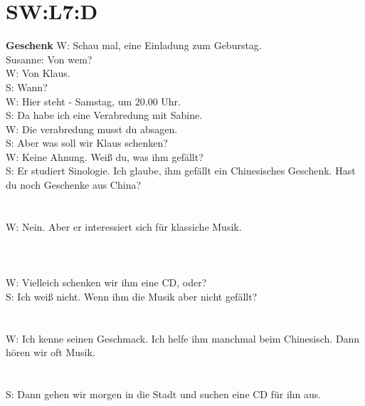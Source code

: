 \section{SW:L7:D}
\noindent
\textbf{Geschenk} 
W: Schau mal, eine Einladung zum Geburstag. \\
Susanne: Von wem? \\
W: Von Klaus. \\
S: Wann? \\
W: Hier steht - Samstag, um 20.00 Uhr.  \\
S: Da habe ich eine Verabredung mit Sabine. \\
W: Die verabredung musst du absagen. \\
S: Aber was soll wir Klaus schenken?  \\
W: Keine Ahnung. Weiß du, was ihm gefällt?  \\
S: Er studiert Sinologie.  Ich glaube, ihm gefällt ein Chinesisches Geschenk.  Hast du noch Geschenke aus China? \\
\\
\\
\noindent
W: Nein. Aber er interessiert sich für klassiche Musik.  \\
\\
\\
\\
\noindent
W: Vielleich schenken wir ihm eine CD, oder? \\
S: Ich weiß nicht. Wenn ihm die Musik aber nicht gefällt?  \\
\\
\\
\noindent
W: Ich kenne seinen Geschmack.  Ich helfe ihm manchmal beim Chinesisch.  Dann hören wir oft Musik. \\
\\
\\
\noindent
S: Dann gehen wir morgen in die Stadt und suchen eine CD für ihn aus.  \\

